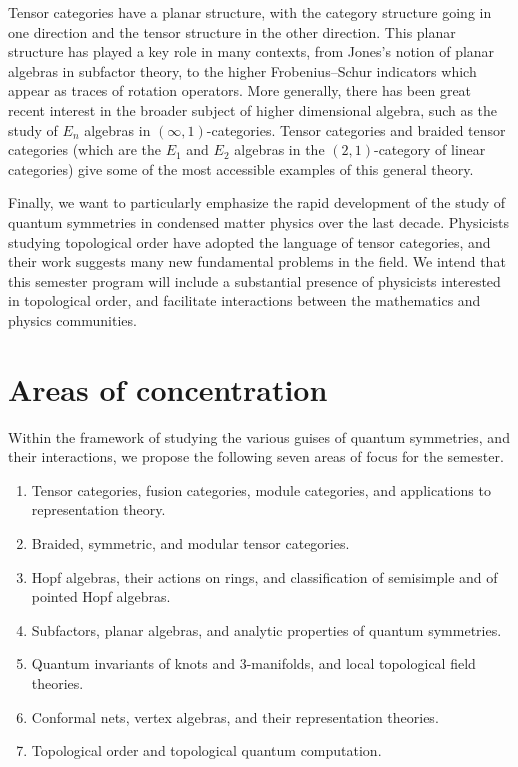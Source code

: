 \documentclass[12pt]{article}
\begin{document}
Tensor categories have a planar structure, with the category structure going in one direction and the tensor structure in the other direction. This planar structure has played a key role in many contexts, from Jones's notion of planar algebras in subfactor theory, to the higher Frobenius--Schur indicators which appear as traces of rotation operators. More generally, there has been great recent interest in the broader subject of higher dimensional algebra, such as the study of $E_n$ algebras in $(\infty,1)$-categories. Tensor categories and braided tensor categories (which are the $E_1$ and $E_2$ algebras in the $(2,1)$-category of linear categories) give some of the most accessible examples of this general theory.

Finally, we want to particularly emphasize the rapid development of the study of quantum symmetries in condensed matter physics over the last decade. Physicists studying topological order have adopted the language of tensor categories, and their work suggests many new fundamental problems in the field. We intend that this semester program will include a substantial presence of physicists interested in topological order, and facilitate interactions between the mathematics and physics communities.

\section{Areas of concentration}
Within the framework of studying the various guises of quantum symmetries, and their interactions, we propose the following seven areas of focus for the semester.

\begin{enumerate}
  \setlength{\itemsep}{1pt}
  \setlength{\parskip}{0pt}
  \setlength{\parsep}{0pt}
\item Tensor categories, fusion categories, module categories, and applications to representation theory.
\item Braided, symmetric, and modular tensor categories.
\item Hopf algebras, their actions on rings, and classification of semisimple and of pointed Hopf algebras.
\item Subfactors, planar algebras, and analytic properties of quantum symmetries.
\item Quantum invariants of knots and 3-manifolds, and local topological field theories.
\item Conformal nets, vertex algebras, and their representation theories.
\item Topological order and topological quantum computation.
\end{enumerate}
\end{document}
